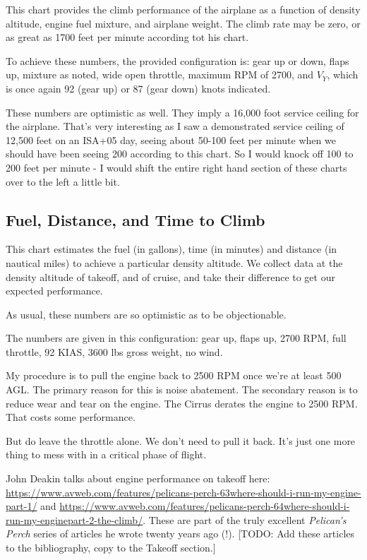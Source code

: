 This chart provides the climb performance of the airplane as a function of density altitude, engine fuel mixture, and airplane weight. The climb rate may be zero, or as great as 1700 feet per minute according tot his chart.

To achieve these numbers, the provided configuration is: gear up or down, flaps up, mixture as noted, wide open throttle, maximum RPM of 2700, and $V_Y$, which is once again 92 (gear up) or 87 (gear down) knots indicated.

These numbers are optimistic as well. They imply a 16,000 foot service ceiling for the airplane. That's very interesting as I saw a demonstrated service ceiling of 12,500 feet on an ISA+05 day, seeing about 50-100 feet per minute when we should have been seeing 200 according to this chart. So I would knock off 100 to 200 feet per minute - I would shift the entire right hand section of these charts over to the left a little bit.

\subsection{Fuel, Distance, and Time to Climb}

This chart estimates the fuel (in gallons), time (in minutes) and distance (in nautical miles) to achieve a particular density altitude. We collect data at the density altitude of takeoff, and of cruise, and take their difference to get our expected performance.

As usual, these numbers are so optimistic as to be objectionable.

The numbers are given in this configuration: gear up, flaps up, 2700 RPM, full throttle, 92 KIAS, 3600 lbs gross weight, no wind.

My procedure is to pull the engine back to 2500 RPM once we're at least 500 AGL. The primary reason for this is noise abatement. The secondary reason is to reduce wear and tear on the engine. The Cirrus derates the engine to 2500 RPM. That costs some performance.

But do leave the throttle alone. We don't need to pull it back. It's just one more thing to mess with in a critical phase of flight.

John Deakin talks about engine performance on takeoff here: \url{https://www.avweb.com/features/pelicans-perch-63where-should-i-run-my-engine-part-1/} and \url{https://www.avweb.com/features/pelicans-perch-64where-should-i-run-my-enginepart-2-the-climb/}. These are part of the truly excellent \emph{Pelican's Perch} series of articles he wrote twenty years ago (!). [TODO: Add these articles to the bibliography, copy to the Takeoff section.]

